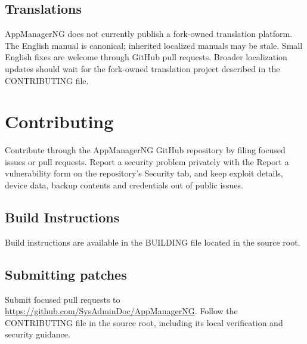 \subsection{Translations}\label{subsec:translations} %
AppManagerNG does not currently publish a fork-owned translation platform. The English manual is canonical; inherited
localized manuals may be stale. Small English fixes are welcome through GitHub pull requests. Broader localization
updates should wait for the fork-owned translation project described in the CONTRIBUTING file.


\section{Contributing}\label{sec:contributing} %
Contribute through the AppManagerNG GitHub repository by filing focused issues or pull requests. Report a security
problem privately with the Report a vulnerability form on the repository's Security tab, and keep exploit details, device
data, backup contents and credentials out of public issues.

\subsection{Build Instructions}\label{subsec:build-instructions} %
Build instructions are available in the BUILDING file located in the source root.

\subsection{Submitting patches}\label{subsec:submitting-patches} %
Submit focused pull requests to \url{https://github.com/SysAdminDoc/AppManagerNG}. Follow the CONTRIBUTING file in the
source root, including its local verification and security guidance.


